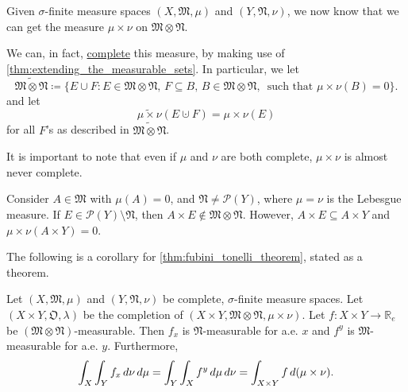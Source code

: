 \documentclass[notoc,notitlepage]{tufte-book}
\begin{document}
\begin{remark}
  Given $\sigma$-finite measure spaces
  $(X, \mathfrak{M}, \mu)$ and $(Y, \mathfrak{N}, \nu)$,
  we now know that we can get the measure $\mu \times \nu$ on $\mathfrak{M}
  \otimes \mathfrak{N}$.

  We can, in fact,
  \hyperref[defn:complete_measure_space]{complete} this measure,
  by making use of \cref{thm:extending_the_measurable_sets}.
  In particular, we let
  \begin{equation*}
    \widetilde{\mathfrak{M} \otimes \mathfrak{N}}
    \coloneqq \{ E \cup F
        : E \in \mathfrak{M} \otimes \mathfrak{N},\,
        F \subseteq B,\, B \in \mathfrak{M} \otimes \mathfrak{N},\,
        \text{ such that } \mu \times \nu(B) = 0 \}.
  \end{equation*}
  and let
  \begin{equation*}
    \widetilde{\mu \times \nu}(E \cupdot F) = \mu \times \nu(E)
  \end{equation*}
  for all $F$'s as described in $\widetilde{\mathfrak{M} \otimes \mathfrak{N}}$.
\end{remark}

\begin{eg}
  It is important to note that even if $\mu$ and $\nu$ are both complete,
  $\mu \times \nu$ is almost never complete.

  Consider $A \in \mathfrak{M}$ with $\mu(A) = 0$,
  and $\mathfrak{N} \neq \mathcal{P}(Y)$,
  where $\mu = \nu$ is the Lebesgue measure.
  If $E \in \mathcal{P}(Y) \setminus \mathfrak{N}$, then
  $A \times E \notin \mathfrak{M} \otimes \mathfrak{N}$.
  However, $A \times E \subseteq A \times Y$
  and $\mu \times \nu(A \times Y) = 0$.
\end{eg}

The following is a corollary for \cref{thm:fubini_tonelli_theorem},
stated as a theorem.

\begin{thm}\label{thm:fubini_tonelli_theorem_for_complete_measures}
  Let $(X, \mathfrak{M}, \mu)$ and $(Y, \mathfrak{N}, \nu)$
  be complete, $\sigma$-finite measure spaces.
  Let $(X \times Y, \mathfrak{O}, \lambda)$ be the completion of
  $(X \times Y, \mathfrak{M} \otimes \mathfrak{N}, \mu \times \nu)$.
  Let $f : X \times Y \to \mathbb{R}_e$
  be $(\mathfrak{M} \otimes \mathfrak{N})$-measurable.
  Then $f_x$ is $\mathfrak{N}$-measurable for a.e. $x$
  and $f^y$ is $\mathfrak{M}$-measurable for a.e. $y$.
  Furthermore, 
  \begin{equation*}
    \int_X \int_Y f_x \mathop{}\!d{\nu} \mathop{}\!d{\mu}
    = \int_Y \int_X f^y \mathop{}\!d{\mu} \mathop{}\!d{\nu}
    = \int_{X \times Y} f \mathop{}\!d{(\mu \times \nu)}.
  \end{equation*}
\end{thm}
\end{document}
